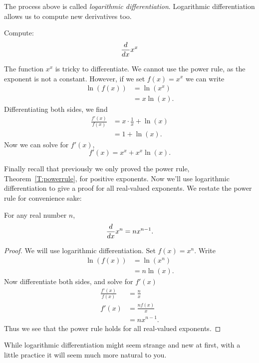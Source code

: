 The process above is called \textit{logarithmic
  differentiation}. Logarithmic differentiation allows us to compute
new derivatives too.

\begin{example}
Compute:
\[
\frac{d}{dx} x^x
\]
\end{example}


\begin{solution}
The function $x^x$ is tricky to differentiate. We cannot use the power
rule, as the exponent is not a constant. However, if we set $f(x) = x^x$ we can write
\begin{align*}
\ln(f(x)) &= \ln\left(x^x\right)\\
&=x\ln(x).
\end{align*}
Differentiating both sides, we find
\begin{align*}
\frac{f'(x)}{f(x)} &= x\cdot \frac{1}{x} + \ln(x)\\
&= 1 + \ln(x).
\end{align*}
Now we can solve for $f'(x)$, 
\[
f'(x) = x^x + x^x\ln(x).
\]
\end{solution}

Finally recall that previously we only proved the power rule,
Theorem~\ref{T:powerrule}, for positive exponents. Now we'll use
logarithmic differentiation to give a proof for all real-valued
exponents. We restate the power rule for convenience sake:

\begin{theorem}
For any real number $n$, 
\[
\frac{d}{dx} x^n = n x^{n-1}.
\]
\end{theorem}

\begin{proof}
We will use logarithmic differentiation. Set $f(x) = x^n$. Write
\begin{align*}
\ln(f(x)) &= \ln\left(x^n\right) \\ 
&= n\ln(x).
\end{align*}
Now differentiate both sides, and solve for $f'(x)$
\begin{align*}
\frac{f'(x)}{f(x)} &= \frac{n}{x}\\
f'(x) &= \frac{nf(x)}{x}\\
&= nx^{n-1}.
\end{align*}
Thus we see that the power rule holds for all real-valued exponents.
\end{proof}

While logarithmic differentiation might seem strange and new at
first, with a little practice it will seem much more natural to you.


